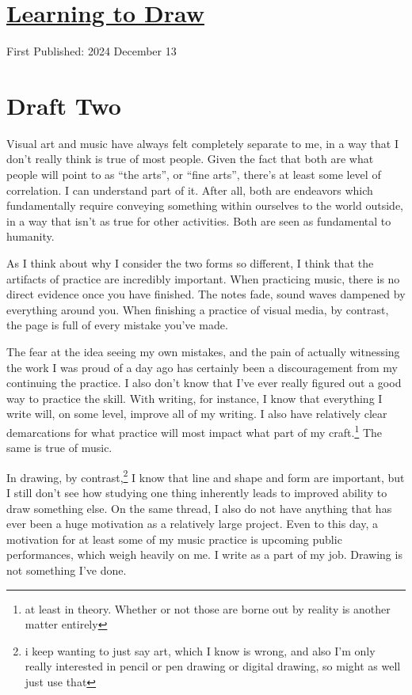 \documentclass[12pt]{article}[titlepage]
\newcommand{\say}[1]{``#1''}
\renewcommand{\,}{\textsuperscript{,}}
\begin{document}
\doublespacing
\section{\href{learning-drawing.html}{Learning to Draw}}
First Published: 2024 December 13
\section{Draft Two}

Visual art and music have always felt completely separate to me, in a way that I don't really think is true of most people.  
Given the fact that both are what people will point to as \say{the arts}, or \say{fine arts}, there's at least some level of correlation.  
I can understand part of it.  
After all, both are endeavors which fundamentally require conveying something within ourselves to the world outside, in a way that isn't as true for other activities.  
Both are seen as fundamental to humanity.

As I think about why I consider the two forms so different, I think that the artifacts of practice are incredibly important.  
When practicing music, there is no direct evidence once you have finished.  
The notes fade, sound waves dampened by everything around you.  
When finishing a practice of visual media, by contrast, the page is full of every mistake you've made.

The fear at the idea seeing my own mistakes, and the pain of actually witnessing the work I was proud of a day ago has certainly been a discouragement from my continuing the practice.  
I also don't know that I've ever really figured out a good way to practice the skill.  
With writing, for instance, I know that everything I write will, on some level, improve all of my writing.  
I also have relatively clear demarcations for what practice will most impact what part of my craft.\footnote{at least in theory. Whether or not those are borne out by reality is another matter entirely}  
The same is true of music.

In drawing, by contrast,\footnote{i keep wanting to just say art, which I know is wrong, and also I'm only really interested in pencil or pen drawing or digital drawing, so might as well just use that} I know that line and shape and form are important, but I still don't see how studying one thing inherently leads to improved ability to draw something else.  
On the same thread, I also do not have anything that has ever been a huge motivation as a relatively large project.  
Even to this day, a motivation for at least some of my music practice is upcoming public performances, which weigh heavily on me.  
I write as a part of my job.  
Drawing is not something I've done.
\end{document}

